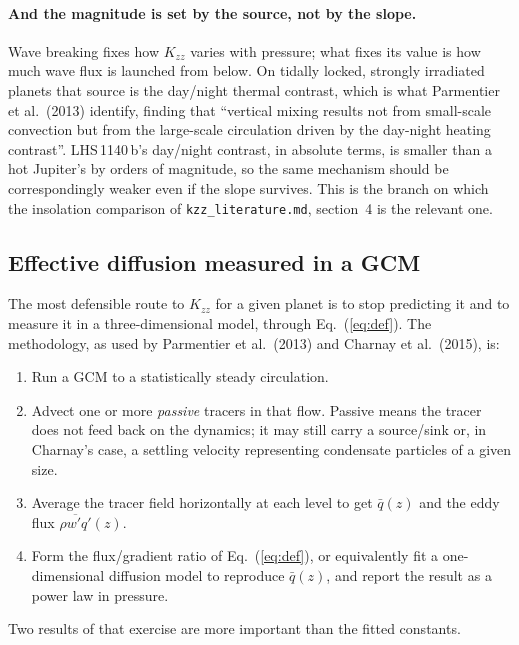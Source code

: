 \documentclass[english,a4paper]{my_memo}
\begin{document}
\paragraph{And the magnitude is set by the source, not by the slope.}
Wave breaking fixes how $K_{zz}$ varies with pressure; what fixes its value
is how much wave flux is launched from below. On tidally locked, strongly
irradiated planets that source is the day/night thermal contrast, which
is what Parmentier et al.\ (2013) identify, finding that ``vertical mixing
results not from small-scale convection but from the large-scale circulation
driven by the day-night heating contrast''. LHS\,1140\,b's day/night
contrast, in absolute terms, is smaller than a hot Jupiter's by orders of
magnitude, so the same mechanism should be correspondingly weaker even if
the slope survives. This is the branch on which the insolation comparison
of \texttt{kzz\_literature.md}, section~4 is the relevant one.

\subsection{Effective diffusion measured in a GCM}
\label{sec:gcm}

The most defensible route to $K_{zz}$ for a given planet is to stop
predicting it and to measure it in a three-dimensional model, through
Eq.~(\ref{eq:def}). The methodology, as used by Parmentier et al.\ (2013)
and Charnay et al.\ (2015), is:

\begin{enumerate}
\item Run a GCM to a statistically steady circulation.
\item Advect one or more \emph{passive} tracers in that flow. Passive means
      the tracer does not feed back on the dynamics; it may still carry a
      source/sink or, in Charnay's case, a settling velocity representing
      condensate particles of a given size.
\item Average the tracer field horizontally at each level to get $\bar q(z)$
      and the eddy flux $\overline{\rho w'q'}(z)$.
\item Form the flux/gradient ratio of Eq.~(\ref{eq:def}), or equivalently
      fit a one-dimensional diffusion model to reproduce $\bar q(z)$, and
      report the result as a power law in pressure.
\end{enumerate}

Two results of that exercise are more important than the fitted constants.
\end{document}
